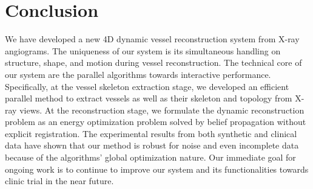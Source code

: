 \documentclass[journal]{IEEEtran}
\begin{document}
%





\section{Conclusion}
We have developed a new 4D dynamic vessel reconstruction system from
X-ray angiograms. The uniqueness of our system is its simultaneous
handling on structure, shape, and motion during vessel reconstruction.
The technical core of our system are the parallel algorithms towards
interactive performance. Specifically, at the vessel skeleton
extraction stage, we developed an efficient parallel method to extract
vessels as well as their skeleton and topology from X-ray views. At
the reconstruction stage, we formulate the dynamic reconstruction
problem as an energy optimization problem solved by belief propagation
without explicit registration. The experimental results from both
synthetic and clinical data have shown that our method is robust for
noise and even incomplete data because of the algorithms' global
optimization nature. Our immediate goal for ongoing work is to
continue to improve our system and its functionalities towards clinic
trial in the near future.
\end{document}

